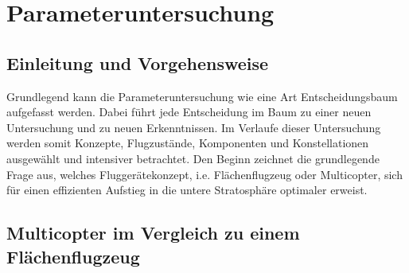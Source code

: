 \chapter{Parameteruntersuchung}
\label{chap:parameteruntersuchung}

\section{Einleitung und Vorgehensweise}
\label{sec:einleitung_und_vorgehensweise}
Grundlegend kann die Parameteruntersuchung wie eine Art Entscheidungsbaum aufgefasst werden. Dabei führt jede Entscheidung im Baum zu einer neuen Untersuchung und zu neuen Erkenntnissen. Im Verlaufe dieser Untersuchung werden somit Konzepte, Flugzustände, Komponenten und Konstellationen ausgewählt und intensiver betrachtet. Den Beginn zeichnet die grundlegende Frage aus, welches Fluggerätekonzept, i.e. Flächenflugzeug oder Multicopter, sich für einen effizienten Aufstieg in die untere Stratosphäre optimaler erweist.   

\section{Multicopter im Vergleich zu einem Flächenflugzeug}
\label{sec:multicopter_vs_flaechenflugzeug}


